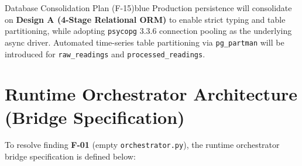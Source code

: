 \documentclass[10pt,a4paper]{report}
\begin{document}
\begin{callout}{Database Consolidation Plan (F-15)}{blue}
Production persistence will consolidate on \textbf{Design A (4-Stage Relational ORM)} to enable strict typing and table partitioning, while adopting \texttt{psycopg} 3.3.6 connection pooling as the underlying async driver. Automated time-series table partitioning via \texttt{pg\_partman} will be introduced for \texttt{raw\_readings} and \texttt{processed\_readings}.
\end{callout}

\section{Runtime Orchestrator Architecture (Bridge Specification)}
To resolve finding \textbf{F-01} (empty \texttt{orchestrator.py}), the runtime orchestrator bridge specification is defined below:
\end{document}
